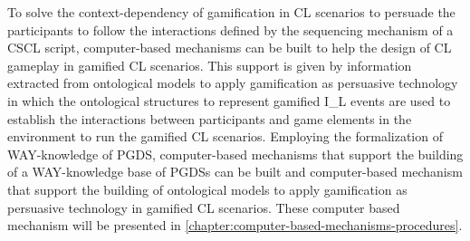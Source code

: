 To solve the context-dependency of gamification in CL scenarios to persuade the participants to follow the interactions defined by the sequencing mechanism of a CSCL script, computer-based mechanisms can be built to help the design of CL gameplay in gamified CL scenarios. This support is given by information extracted from ontological models to apply gamification as persuasive technology in which the ontological structures to represent gamified I\_L events are used to establish the interactions between participants and game elements in the environment to run the gamified CL scenarios. Employing the formalization of WAY-knowledge of PGDS, computer-based mechanisms that support the building of a WAY-knowledge base of PGDSs can be built and computer-based mechanism that support the building of ontological models to apply gamification as persuasive technology in gamified CL scenarios. These computer based mechanism will be presented in \autoref{chapter:computer-based-mechanisms-procedures}. 
